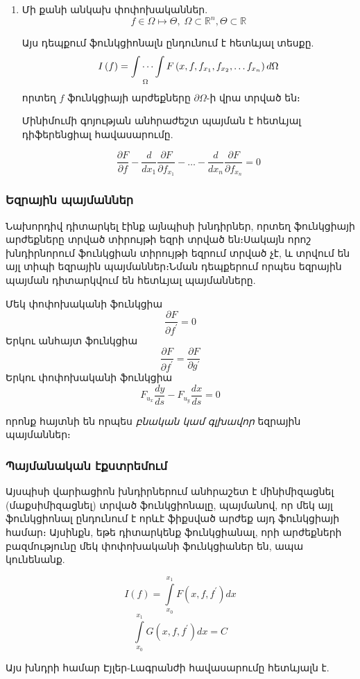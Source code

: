 \documentclass[fleqn, bachelor,subf,12pt,notitlepage]{article}
\begin{document}
\begin{enumerate}
\item Մի քանի անկախ փոփոխականներ.
$$f \in \Omega \mapsto \Theta, \; \Omega \subset \mathbb{R}^{n}, \Theta \subset \mathbb{R}$$

\noindent Այս դեպքում ֆունկցիոնալն ընդունում է հետևյալ տեսքը.
$$I\left(f\right) = \idotsint \limits_{\Omega} F\left(x, f, f_{x_{1}}, f_{x_{2}}, \dots f_{x_{n} }\right)d\Omega$$
\noindent որտեղ $f$ ֆունկցիայի արժեքները $\partial \Omega$-ի վրա տրված են։

\noindent Մինիմումի  գոյության անհրաժեշտ պայման է հետևյալ դիֆերենցիալ հավասարումը.

$$\dfrac{\partial F}{\partial f} - \dfrac{d}{dx_{1}}\dfrac{\partial F}{\partial f_{x_{1}}} - \dots -\dfrac{d}{dx_{n}}\dfrac{\partial F}{\partial f_{x_{n}}}=0$$
\end{enumerate}
\newpage
\subsubsection*{{Եզրային պայմաններ}}
Նախորդիվ դիտարկել էինք այնպիսի խնդիրներ, որտեղ ֆունկցիայի արժեքները տրված տիրույթի եզրի տրված են։Սակայն որոշ խնդիրնորում ֆունկցիան տիրույթի եզրում տրված չէ, և տրվում են այլ տիպի եզրային պայմաններ։Նման դեպքերում որպես եզրային պայման դիտարկվում են հետևյալ պայմանները.

\noindent Մեկ փոփոխականի ֆունկցիա
$$\dfrac{\partial F}{\partial f^{'}}=0$$
Երկու անհայտ ֆունկցիա
$$\dfrac{\partial F}{\partial f^{'}}=\dfrac{\partial F}{\partial g^{'}}$$
Երկու փոփոխականի ֆունկցիա
$$F_{u_{x}}\dfrac{dy}{ds}-F_{u_{y}}\dfrac{dx}{ds}=0$$

\noindent որոնք հայտնի են որպես \emph{բնական կամ գլխավոր}  եզրային պայմաններ։

\subsubsection*{{Պայմանական էքստրեմում}}
Այսպիսի վարիացիոն խնդիրներում անհրաշետ է մինիմիզացնել (մաքսիմիզացնել) տրված ֆունկցիոնալը, պայմանով, որ մեկ այլ ֆունկցիոնալ ընդունում է որևէ ֆիքսված արժեք այդ ֆունկցիայի համար։ Այսինքն, եթե դիտարկենք ֆունկցիանալ, որի արժեքների բազմությունը մեկ փոփոխականի ֆունկցիաներ են, ապա կունենանք.

$$I\left(f\right)=\int \limits_{x_{0}}^{x_{1}} F\left(x, f, f^{'}\right)dx $$
$$\int \limits_{x_{0}}^{x_{1}} G\left(x, f, f^{'}\right)dx = C$$

Այս խնդրի համար Էյլեր-Լագրանժի հավասարումը հետևյալն է.
\end{document}
